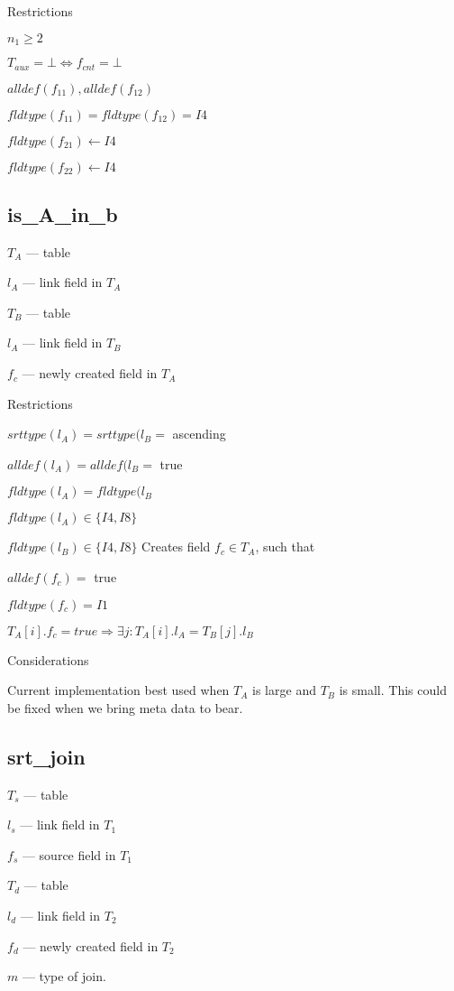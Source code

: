 \documentclass{report}
\begin{document}
Restrictions
\be
\item \(n_1 \geq 2\) 
\item \(T_{aux}  = \bot \Leftrightarrow f_{cnt} = \bot\)
\item \(alldef(f_{11}), alldef(f_{12}) \)
\item \(fldtype(f_{11}) = fldtype(f_{12}) = I4\)
\item \(fldtype(f_{21}) \leftarrow I4\)
\item \(fldtype(f_{22}) \leftarrow I4\)
\ee


\subsection{is\_A\_in\_b}
\label{is_A_in_b}

\be
\item \(T_A\) --- table
\item \(l_A\) --- link field in \(T_A\)
\item \(T_B\) --- table
\item \(l_A\) --- link field in \(T_B\)
\item \(f_c\) --- newly created field in \(T_A\)
\ee

Restrictions
\be
\item \(srttype(l_A) = srttype(l_B = \) ascending
\item \(alldef(l_A) = alldef(l_B = \) true
\item \(fldtype(l_A) = fldtype(l_B \)
\item \(fldtype(l_A) \in \{I4, I8\}\)
\item \(fldtype(l_B) \in \{I4, I8\}\)
\ee
Creates field \(f_c \in T_A\), such that 
\be
\item \(alldef(f_c) = \) true
\item \(fldtype(f_c) = I1\)
\item \(T_A[i].f_c = true \Rightarrow \exists j: T_A[i].l_A =
T_B[j].l_B\)
\ee

Considerations
\be
\item Current implementation best used when \(T_A\) is large and \(T_B\)
is small. This could be fixed when we bring meta data to bear.
\ee

\subsection{srt\_join}
\label{srt_join}

\be
\item \(T_s\) --- table
\item \(l_s\) --- link field in \(T_1\)
\item \(f_s\) --- source field in \(T_1\)
\item \(T_d\) --- table
\item \(l_d\) --- link field in \(T_2\)
\item \(f_d\) --- newly created field in \(T_2\)
\item \(m\) --- type of join. 
\ee
\end{document}
